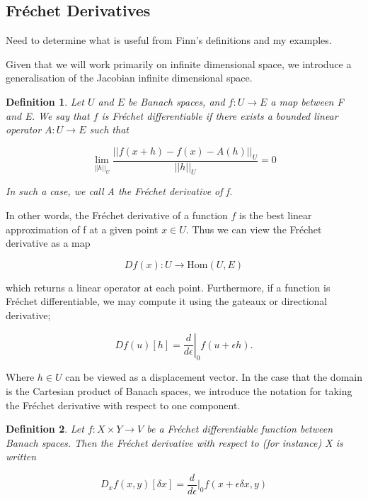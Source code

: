\documentclass{article}
\newtheorem{definition}{Definition}
\newcommand{\ep}{\epsilon}
\begin{document}
\subsection{Fr\'echet Derivatives}
Need to determine what is useful from Finn's definitions and my examples. 
{\color{blue}
Given that we will work primarily on infinite dimensional space, we introduce a generalisation of the Jacobian infinite dimensional space.

\begin{definition}
    Let $U$ and $E$ be Banach spaces, and $f:U \to E$ a map between F and E. We say that $f$ is Fr\'echet differentiable if there exists a bounded linear operator $A: U\to E$ such that

    \begin{equation}
    \lim_{||h||_U}\frac{||f(x+h)-f(x) - A(h)||_U}{||h||_U} = 0 
    \end{equation}

   In such a case, we call A the Fr\'echet derivative of f. 
\end{definition}

In other words, the Fr\'echet derivative of a function $f$ is the best linear approximation of f at a given point $x\in U$. Thus we can view the Fr\'echet derivative as a map

\begin{equation}
    Df(x): U\to\text{Hom}(U,E)
\end{equation}

which returns a linear operator at each point. Furthermore, if a function is Fr\'echet differentiable, we may compute it using the gateaux or directional derivative;

\begin{equation} 
    Df(u)[h] = \left. \frac{d}{d\ep} \right|_0 f(u+\ep h). 
\end{equation}

Where $h\in U$ can be viewed as a displacement vector. In the case that the domain is the Cartesian product of Banach spaces, we introduce the notation for taking the Fr\'echet derivative with respect to one component.

\begin{definition}
    Let $f:X\times Y \to V $ be a Fr\'echet differentiable function between Banach spaces. Then the Fr\'echet derivative with respect to (for instance) X is written

\begin{equation}
    D_xf(x,y)[\delta x] = \frac{d}{d\ep} \bigg|_0 f(x + \ep\delta x, y) 
\end{equation}
\end{definition} 
}
\end{document}
